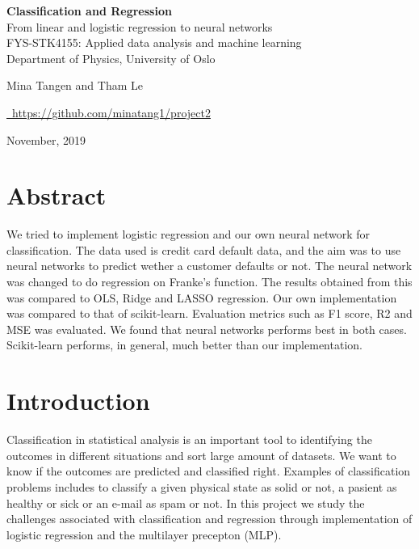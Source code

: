 \documentclass[11pt,english, A4]{article}
\begin{document}
\begin{center}
\Huge \textbf{Classification and Regression}\\
\Large{From linear and logistic regression to neural networks}\\
\vspace{6mm}
\small{FYS-STK4155: Applied data analysis and machine learning}\\
\small{Department of Physics, University of Oslo}

\vspace{6mm}
\Large {Mina Tangen and Tham Le}
\vspace{2mm}

\faGithub\href{https://github.com/}{\  https://github.com/minatang1/project2} 


\thispagestyle{empty}
\end{center}

\begin{flushright}
\small November, 2019
\end{flushright}


\section*{Abstract}
We tried to implement logistic regression and our own neural network for classification. The data used is credit card default data, and the aim was to use neural networks to predict wether a customer defaults or not. The neural network was changed to do regression on Franke's function. The results obtained from this was compared to OLS, Ridge and LASSO regression. Our own implementation was compared to that of scikit-learn. Evaluation metrics such as F1 score, R2 and MSE was evaluated. We found that neural networks performs best in both cases. Scikit-learn performs, in general, much better than our implementation. 



\newpage


{
  \hypersetup{linkcolor=black}
  \tableofcontents
}

\newpage
\section{Introduction}
Classification in statistical analysis is an important tool to identifying the outcomes in different situations and sort large amount of datasets. We want to know if the outcomes are predicted and classified right. Examples of classification problems includes to classify  a given physical state as solid or not, a pasient as healthy or sick or an e-mail as spam or not. In this project we study the challenges associated with classification and regression through implementation of logistic regression and the multilayer precepton (MLP). \\
\end{document}
